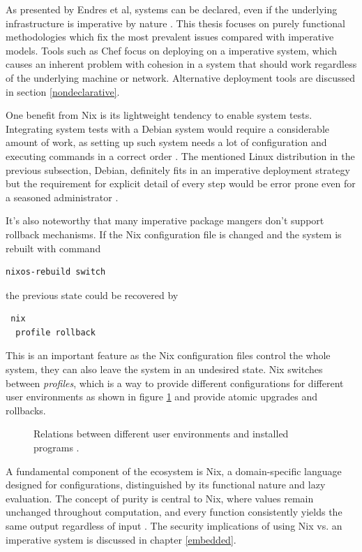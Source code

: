 As presented by Endres et al, systems can be declared, even if the
underlying infrastructure is imperative by nature
\cite{endres2017declarative}. This thesis focuses on purely functional
methodologies which fix the most prevalent issues compared with
imperative models. Tools such as Chef focus on deploying on a
imperative system, which causes an inherent problem with cohesion in a
system that should work regardless of the underlying machine or
network. Alternative deployment tools are discussed in section
\ref{nondeclarative}.

One benefit from Nix is its lightweight tendency to enable system
tests. Integrating system tests with a Debian system would require a
considerable amount of work, as setting up such system needs a lot of
configuration and executing commands in a correct order
\cite{van2010automating}. The mentioned Linux distribution in the
previous subsection, Debian, definitely fits in an imperative
deployment strategy but the requirement for explicit detail of every
step would be error prone even for a seasoned administrator
\cite{breitenbucher2017declarative}.

It's also noteworthy that many imperative package mangers don't
support rollback mechanisms. If the Nix configuration file is changed
and the system is rebuilt with command
\begin{lstlisting}
nixos-rebuild switch
\end{lstlisting}
the previous state could be recovered by \begin{lstlisting} nix
  profile rollback
\end{lstlisting}
This is an important feature as the Nix configuration files control
the whole system, they can also leave the system in an undesired
state. Nix switches between \textit{profiles}, which is a way to
provide different configurations for different user environments as
shown in figure \ref{userenvs} and provide atomic upgrades and
rollbacks. \cite{nixosNixOSManual}

\begin{figure}[t!]
\centerline{}
\caption{Relations between different user environments and installed
  programs \cite{nixosUserEnvironment}.}
\label{userenvs}
\end{figure}

A fundamental component of the ecosystem is Nix, a domain-specific
language designed for configurations, distinguished by its functional
nature and lazy evaluation. The concept of purity is central to Nix,
where values remain unchanged throughout computation, and every
function consistently yields the same output regardless of input
\cite{dolstra2013charon}. The security implications of using Nix
vs. an imperative system is discussed in chapter \ref{embedded}.

